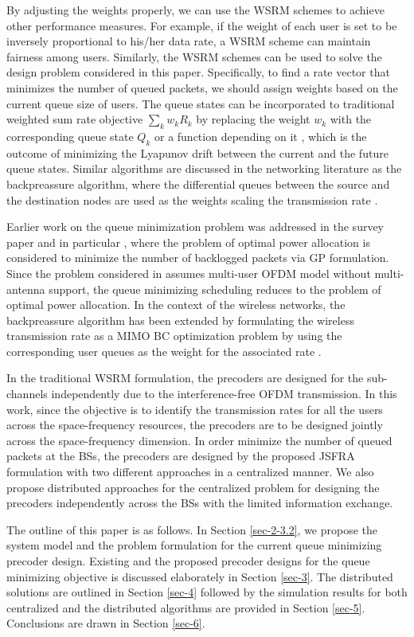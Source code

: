 By adjusting the weights properly, we can use the \ac{WSRM} schemes to achieve other performance measures. For example, if the weight of each user is set to be inversely proportional to his/her data rate, a \ac{WSRM} scheme can maintain fairness among users. Similarly, the \ac{WSRM} schemes can be used to solve the design problem considered in this paper. Specifically, to find a rate vector that minimizes the number of queued packets, we should assign weights based on the current queue size of users. The queue states can be incorporated to traditional weighted sum rate objective $\sum_k w_k R_k$ by replacing the weight $w_k$ with the corresponding queue state $Q_k$ or a function depending on it \cite{tassiulas,neely2010stochastic}, which is the outcome of minimizing the Lyapunov drift between the current and the future queue states. Similar algorithms are discussed in the networking literature as the backpreassure algorithm, where the differential queues between the source and the destination nodes are used as the weights scaling the transmission rate \cite{georgiadis2006resource}.

Earlier work on the queue minimization problem was addressed in the survey paper \cite{berry2004cross} and in particular \cite{qps_cioffi}, where the problem of optimal power allocation is considered to minimize the number of backlogged packets via \acl{GP} formulation. Since the problem considered in \cite{qps_cioffi} assumes multi-user \ac{OFDM} model without multi-antenna support, the queue minimizing scheduling reduces to the problem of optimal power allocation. In the context of the wireless networks, the backpreassure algorithm has been extended by formulating the wireless transmission rate as a \ac{MIMO} \ac{BC} optimization problem by using the corresponding user queues as the weight for the associated rate \cite{weeraddana2011resource}.

In the traditional \ac{WSRM} formulation, the precoders are designed for the sub-channels independently due to the interference-free \ac{OFDM} transmission. In this work, since the objective is to identify the transmission rates for all the users across the space-frequency resources, the precoders are to be designed jointly across the space-frequency dimension. In order minimize the number of queued packets at the \acp{BS}, the precoders are designed by the proposed \ac{JSFRA} formulation with two different approaches in a centralized manner. We also propose distributed approaches for the centralized problem for designing the precoders independently across the \acp{BS} with the limited information exchange.

The outline of this paper is as follows. In Section \ref{sec-2-3.2}, we propose the system model and the problem formulation for the current queue minimizing precoder design. Existing and the proposed precoder designs for the queue minimizing objective is discussed elaborately in Section \ref{sec-3}. The distributed solutions are outlined in Section \ref{sec-4} followed by the simulation results for both centralized and the distributed algorithms are provided in Section \ref{sec-5}. Conclusions are drawn in Section \ref{sec-6}.